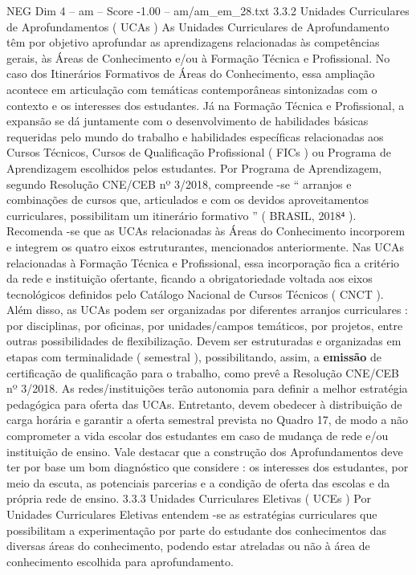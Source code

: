 \begin{textsample}{NEG Dim 4 – am – Score -1.00 – am/am\_em\_28.txt}  \label{ex:f4_neg_185}
3.3.2 Unidades Curriculares de Aprofundamentos ( UCAs ) As Unidades Curriculares de Aprofundamento têm por objetivo aprofundar as aprendizagens relacionadas às competências gerais, às Áreas de Conhecimento e/ou à Formação Técnica e Profissional.
No caso dos Itinerários Formativos de Áreas do Conhecimento, essa ampliação acontece em articulação com temáticas contemporâneas sintonizadas com o contexto e os interesses dos estudantes.
Já na Formação Técnica e Profissional, a expansão se dá juntamente com o desenvolvimento de habilidades básicas requeridas pelo mundo do trabalho e habilidades específicas relacionadas aos Cursos Técnicos, Cursos de Qualificação Profissional ( FICs ) ou Programa de Aprendizagem escolhidos pelos estudantes.
Por Programa de Aprendizagem, segundo Resolução CNE/CEB nº 3/2018, compreende -se “ arranjos e combinações de cursos que, articulados e com os devidos aproveitamentos curriculares, possibilitam um itinerário formativo ” ( BRASIL, 2018⁴ ).
Recomenda -se que as UCAs relacionadas às Áreas do Conhecimento incorporem e integrem os quatro eixos estruturantes, mencionados anteriormente.
Nas UCAs relacionadas à Formação Técnica e Profissional, essa incorporação fica a critério da rede e instituição ofertante, ficando a obrigatoriedade voltada aos eixos tecnológicos definidos pelo Catálogo Nacional de Cursos Técnicos ( CNCT ).
Além disso, as UCAs podem ser organizadas por diferentes arranjos curriculares : por disciplinas, por oficinas, por unidades/campos temáticos, por projetos, entre outras possibilidades de flexibilização.
Devem ser estruturadas e organizadas em etapas com terminalidade ( semestral ), possibilitando, assim, a \textbf{emissão} de certificação de qualificação para o trabalho, como prevê a Resolução CNE/CEB nº 3/2018.
As redes/instituições terão autonomia para definir a melhor estratégia pedagógica para oferta das UCAs.
Entretanto, devem obedecer à distribuição de carga horária e garantir a oferta semestral prevista no Quadro 17, de modo a não comprometer a vida escolar dos estudantes em caso de mudança de rede e/ou instituição de ensino.
Vale destacar que a construção dos Aprofundamentos deve ter por base um bom diagnóstico que considere : os interesses dos estudantes, por meio da escuta, as potenciais parcerias e a condição de oferta das escolas e da própria rede de ensino. 3.3.3 Unidades Curriculares Eletivas ( UCEs ) Por Unidades Curriculares Eletivas entendem -se as estratégias curriculares que possibilitam a experimentação por parte do estudante dos conhecimentos das diversas áreas do conhecimento, podendo estar atreladas ou não à área de conhecimento escolhida para aprofundamento.

\end{textsample}
